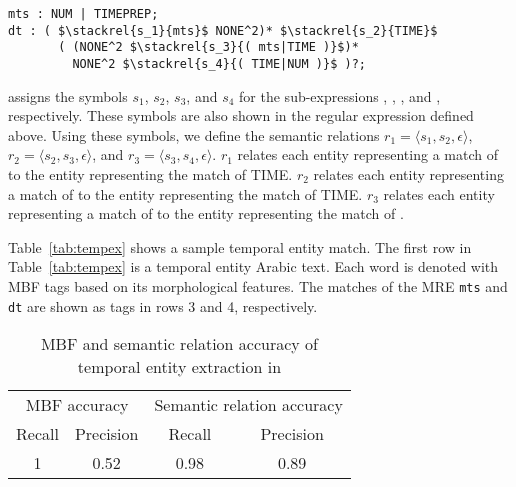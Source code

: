 \begin{appendices}
\begin{Verbatim}[fontsize=\relsize{-1},commandchars=\\\{\},codes={\catcode`$=3 \catcode`_=8}]
mts : NUM | TIMEPREP;
dt : ( $\stackrel{s_1}{mts}$ NONE^2)* $\stackrel{s_2}{TIME}$
       ( (NONE^2 $\stackrel{s_3}{( mts|TIME )}$)* 
         NONE^2 $\stackrel{s_4}{( TIME|NUM )}$ )?;
\end{Verbatim}

\framework assigns the symbols $s_1$, $s_2$, $s_3$, and $s_4$ for the sub-expressions , , , and , respectively. 
These symbols are also shown in the regular expression defined above. 
Using these symbols, we define the semantic relations $r_1=\langle s_1,s_2,\epsilon\rangle$, $r_2=\langle s_2,s_3,\epsilon\rangle$, and $r_3=\langle s_3,s_4,\epsilon\rangle$. 
$r_1$ relates each entity representing a match of  to the entity representing the match of TIME. 
$r_2$ relates each entity representing a match of  to the entity representing the match of TIME. 
$r_3$ relates each entity representing a match of  to the entity representing the match of .

\begin{table}[tb!]
  \centering
  \caption{Temporal entity example}
  \label{tab:tempex}%
\end{table}%

Table~\ref{tab:tempex} shows a sample temporal entity match. 
The first row in Table~\ref{tab:tempex} is a temporal entity Arabic text. 
Each word is denoted with MBF tags based on its morphological features. 
The matches of the MRE {\tt mts} and {\tt dt} are shown as tags in rows 3 and 4, respectively.

\begin{table}[tb!]
  \centering
  \caption{MBF and semantic relation accuracy of temporal entity extraction in \framework}
    \begin{tabular}{c|c|c|c}
     \toprule
     \multicolumn{2}{c|}{MBF accuracy} & \multicolumn{2}{c}{Semantic relation accuracy}\\
     Recall & Precision & Recall & Precision \\
    \midrule
    1 & 0.52 & 0.98 & 0.89 \\
    \bottomrule
    \end{tabular}%
  \label{tab:tmbfer}%
\end{table}%


\end{appendices}
